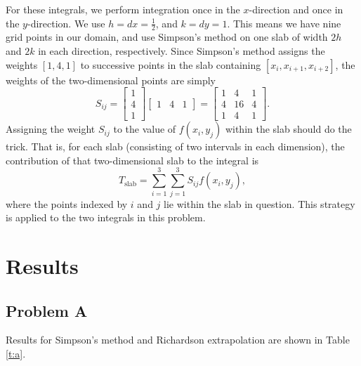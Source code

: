 \documentclass[12pt]{article}
\begin{document}
For these integrals, we perform integration once in the $x$-direction and once in the $y$-direction. We use $h = dx = \tfrac{1}{2}$, and $k = dy = 1$. This means we have nine grid points in our domain, and use Simpson's method on one slab of width $2h$ and $2k$ in each direction, respectively. Since Simpson's method assigns the weights $[1, 4, 1]$ to successive points in the slab containing $[x_i, x_{i+1}, x_{i+2}]$, the weights of the two-dimensional points are simply
\begin{equation}
S_{ij} = 
\begin{bmatrix}
1 \\
4 \\
1
\end{bmatrix}
\begin{bmatrix}
1 & 4 & 1
\end{bmatrix}
=
\begin{bmatrix}
1 &  4 & 1 \\
4 & 16 & 4 \\
1 &  4 & 1
\end{bmatrix}
.
\end{equation}
Assigning the weight $S_{ij}$ to the value of $f(x_i,y_j)$ within the slab should do the trick. That is, for each slab (consisting of two intervals in each dimension), the contribution of that two-dimensional slab to the integral is
\begin{equation}
T_\text{slab} = \sum_{i=1}^{3} \sum_{j=1}^{3} S_{ij} f(x_i,y_j)
,
\end{equation}
where the points indexed by $i$ and $j$ lie within the slab in question. This strategy is applied to the two integrals in this problem.

\section{Results}

\subsection{Problem A}

Results for Simpson's method and Richardson extrapolation are shown in Table \ref{t:a}.
\end{document}
